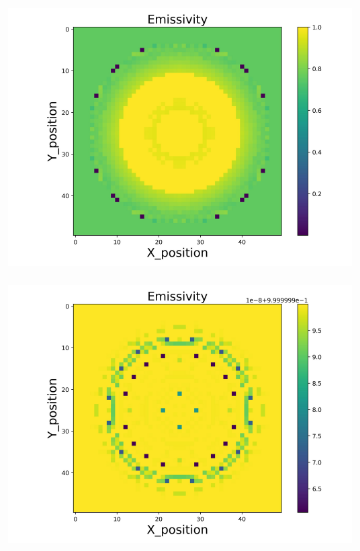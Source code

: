 \begin{figure}[p]
    \centering
    \begin{minipage}{\textwidth}
        \centering
        \begin{subfigure}{0.325\textwidth}
            \centering
            \includegraphics[width=\textwidth]{figures/raw_data/0/quad/emi_cal.jpg}
        \end{subfigure}
        \begin{subfigure}{0.325\textwidth}
            \centering
            \includegraphics[width=\textwidth]{figures/raw_data/5/quad/emi_cal.jpg}
        \end{subfigure}

\end{minipage}
\end{figure}
